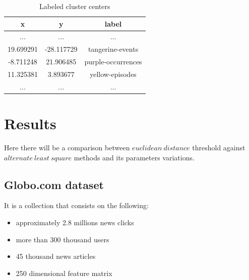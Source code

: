 \documentclass[ecp,tc,english]{iiufrgs}
\begin{document}
        \begin{table}[H]
            \centering
                \begin{tabular}{ |c|c|c| } 
                \hline
                x & y & label \\
                \hline 
                ... & ...  & ... \\
                19.699291 & -28.117729 & tangerine-events \\ 
                -8.711248 & 21.906485 & purple-occurrences \\ 
                11.325381 & 3.893677 & yellow-episodes \\ 
                ... & ...  & ...  \\
                \hline
                \end{tabular}
            \caption{Labeled cluster centers}
            \label{tab:labeled_clusters}
        \end{table}


\chapter{Results}

    Here there will be a comparison between \(euclidean\ distance\) threshold against \(alternate\ least\ square\) methods and its parameters variations.

    \section{Globo.com dataset} %
    It is a collection that consists on the following:
    \begin{itemize}
        \item approximately 2.8 millions news clicks
        \item more than 300 thousand users
        \item 45 thousand news articles
        \item 250 dimensional feature matrix
    \end{itemize}
    
\end{document}

